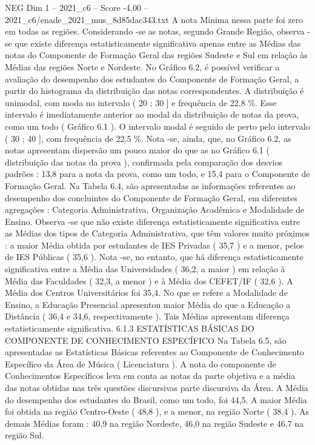 \begin{textsample}{NEG Dim 1 – 2021\_c6 – Score -4.00 – 2021\_c6/enade\_2021\_mus\_8d85dac343.txt}
A nota Mínima nessa parte foi zero em todas as regiões.
Considerando -se as notas, segundo Grande Região, observa -se que existe diferença estatisticamente significativa apenas entre as Médias das notas do Componente de Formação Geral das regiões Sudeste e Sul em relação às Médias das regiões Norte e Nordeste.
No Gráfico 6.2, é possível verificar a avaliação do desempenho dos estudantes do Componente de Formação Geral, a partir do histograma da distribuição das notas correspondentes.
A distribuição é unimodal, com moda no intervalo ( 20 ; 30 ] e frequência de 22,8 \%.
Esse intervalo é imediatamente anterior ao modal da distribuição de notas da prova, como um todo ( Gráfico 6.1 ).
O intervalo modal é seguido de perto pelo intervalo ( 30 ; 40 ], com frequência de 22,5 \%.
Nota -se, ainda, que, no Gráfico 6.2, as notas apresentam dispersão um pouco maior do que as no Gráfico 6.1 ( distribuição das notas da prova ), confirmada pela comparação dos desvios padrões : 13,8 para a nota da prova, como um todo, e 15,4 para o Componente de Formação Geral.
Na Tabela 6.4, são apresentadas as informações referentes ao desempenho dos concluintes do Componente de Formação Geral, em diferentes agregações : Categoria Administrativa, Organização Acadêmica e Modalidade de Ensino.
Observa -se que não existe diferença estatisticamente significativa entre as Médias dos tipos de Categoria Administrativa, que têm valores muito próximos : a maior Média obtida por estudantes de IES Privadas ( 35,7 ) e a menor, pelos de IES Públicas ( 35,6 ).
Nota -se, no entanto, que há diferença estatisticamente significativa entre a Média das Universidades ( 36,2, a maior ) em relação à Média das Faculdades ( 32,3, a menor ) e à Média dos CEFET/IF ( 32,6 ).
A Média dos Centros Universitários foi 35,4.
No que se refere a Modalidade de Ensino, a Educação Presencial apresentou maior Média do que a Educação a Distância ( 36,4 e 34,6, respectivamente ).
Tais Médias apresentam diferença estatisticamente significativa. 6.1.3 ESTATÍSTICAS BÁSICAS DO COMPONENTE DE CONHECIMENTO ESPECÍFICO Na Tabela 6.5, são apresentadas as Estatísticas Básicas referentes ao Componente de Conhecimento Específico da Área de Música ( Licenciatura ).
A nota do componente de Conhecimentos Específicos leva em conta as notas da parte objetiva e a média das notas obtidas nas três questões discursivas parte discursiva da Área.
A Média do desempenho dos estudantes do Brasil, como um todo, foi 44,5.
A maior Média foi obtida na região Centro-Oeste ( 48,8 ), e a menor, na região Norte ( 38,4 ).
As demais Médias foram : 40,9 na região Nordeste, 46,0 na região Sudeste e 46,7 na região Sul.

\end{textsample}
